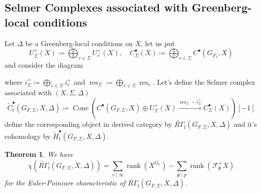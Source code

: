 \documentclass[10pt]{amsart}
\numberwithin{equation}{section}
\newtheorem{thm}{Theorem}[section]
\theoremstyle{definition}
\theoremstyle{remark} %
\newcommand{\mrm}{\mathrm}
\DeclareMathOperator{\rank}{rank}
\DeclareMathOperator{\res}{res}
\newcommand{\scrF}{\mathscr{F}}
\newcommand{\p}{\mathfrak{p}}
\begin{document}
	\subsection{Selmer Complexes associated with Greenberg-local conditions}
	Let $ \Delta $ be a Greenberg-local conditions on $ X $, let us put 
	$$ U_{\Sigma}^{+}(X) \coloneqq \bigoplus_{v \in \Sigma}U_{v}^{+}(X), \quad C^{\bullet}_{\Sigma}(X) \coloneqq \bigoplus_{v \in \Sigma}C^{\bullet}(G_{F_v},X)  $$ 
	and consider the diagram
	\begin{center}
	\end{center}
	where $ i_{\Sigma}^{+} \coloneqq \bigoplus_{v \in \Sigma}i_{v}^{+} $ and $ \res_{\Sigma} \coloneqq \bigoplus_{v \in \Sigma}\res_{v} $. \newline
	Let's define the Selmer complex associated with $(X,\Sigma , \Delta )$ 
	$$ \widetilde{C}_{\mrm{f}}^{\bullet}(G_{F,\Sigma},X, \Delta)\coloneqq \operatorname{Cone}(C^{\bullet}(G_{F, \Sigma},X) \oplus U_{\Sigma}^{+}(X) \xrightarrow{\res_{\Sigma}-i_{\Sigma}^{+}} C^{\bullet}_{\Sigma}(X))[-1] $$
	define the corresponding object in derived category by $ \widetilde{R\Gamma}_{\mathrm{f}}(G_{F,\Sigma},X, \Delta) $ and it's cohomology by $ \widetilde{H}_{\mathrm{f}}^{\bullet}(G_{F,\Sigma},X, \Delta) $.
	\begin{thm}
		\cite[Theorem 7.8.6]{Nek06}
		\label{euler_characteristisc}
		We have 
		$$ \chi(\widetilde{R\Gamma}_{\mathrm{f}}(G_{F,\Sigma},X, \Delta)) = \sum_{v \mid \infty}\rank(X^{G_v}) - \sum_{\p \mid p}\rank(\scrF^+_{\p} X) $$
		for the Euler-Poincare characteristic of $ \widetilde{R\Gamma}_{\mathrm{f}}(G_{F,\Sigma},X, \Delta) $.	
	\end{thm}
\end{document}
